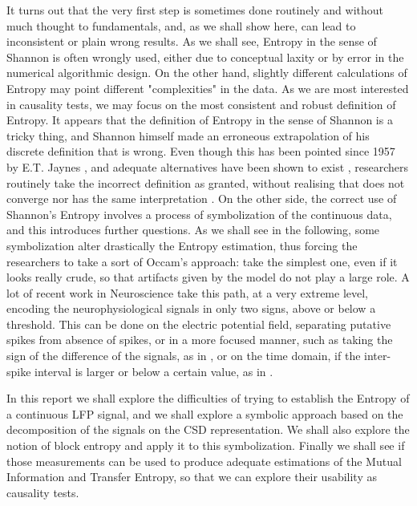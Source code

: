\documentclass[10pt]{article}
\begin{document}
It turns out that the very first step is sometimes done routinely and without much thought to fundamentals, and, as we shall show here, can lead to inconsistent or plain wrong results. As we shall see, Entropy in the sense of Shannon is often wrongly used, either due to conceptual laxity or by error in the numerical algorithmic design. On the other hand, slightly different calculations of Entropy may point different "complexities" in the data. As we are most interested in causality tests, we may focus on the most consistent and robust definition of Entropy. It appears that the definition of Entropy in the sense of Shannon is a tricky thing, and Shannon himself made an erroneous extrapolation of his discrete definition that is wrong. Even though this has been pointed since 1957 by E.T. Jaynes \cite{Jaynes1957}, and adequate alternatives have been shown to exist
\cite{Kullback1951, Schroeder2004}, researchers routinely take the incorrect definition as granted, without realising that does not converge nor has the same interpretation \cite{Jaynes1968}. On the other side, the correct use of Shannon's Entropy involves
a process of symbolization of the continuous data, and this introduces further
questions. As we shall see in the following, some symbolization alter drastically
the Entropy estimation, thus forcing the researchers to take a sort of Occam's approach:
take the simplest one, even if it looks really crude, so that artifacts given
by the model do not play a large role. A lot of recent work in Neuroscience take this
path, at a very extreme level, encoding the neurophysiological signals in
only two signs, above or below a threshold. This can be done on the electric potential field, separating putative spikes from absence of spikes, or in a  more
focused manner, such as taking the sign of
the difference of the signals, as in \cite{Steuer2004}, or on
the time domain, if the inter-spike interval is larger or below a certain value,
as in \cite{Steuer2001}.

In this report we shall explore the difficulties of trying to establish the
Entropy of a continuous LFP signal, and we shall explore a symbolic approach based
on the decomposition of the signals on the CSD representation. We shall also explore
the notion of block entropy and apply it to this symbolization. Finally we shall
see if those measurements can be used to produce adequate estimations of the
Mutual Information and Transfer Entropy, so that we can explore their
usability as causality tests.
\end{document}

